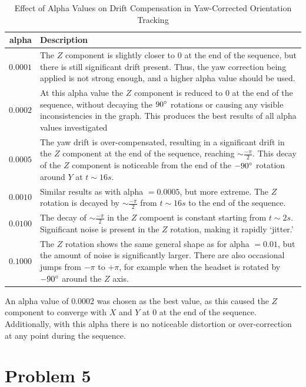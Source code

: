\documentclass[11pt,a4paper]{article}
\begin{document}
	\begin{table}[h!]
		\caption{Effect of Alpha Values on Drift Compensation in Yaw-Corrected Orientation Tracking}
		\label{table_alpha_yaw}
		\begin{tabu} to 1.0\linewidth {|r|X[l]|}
			\hline
			alpha&Description\\
			\hline
			$0.0001$&The $Z$ component is slightly closer to $0$ at the end of the sequence, but there is still significant drift present. Thus, the yaw correction being applied is not strong enough, and a higher alpha value should be used.\\
			\hline
			$0.0002$&At this alpha value the $Z$ component is reduced to 0 at the end of the sequence, without decaying the $90\degree$ rotations or causing any visible inconsistencies in the graph. This produces the best results of all alpha values investigated\\
			\hline
			$0.0005$&The yaw drift is over-compensated, resulting in a significant drift in the $Z$ component at the end of the sequence, reaching $\sim\frac{-\pi}{2}$. This decay of the $Z$ component is noticeable from the end of the $-90\degree$ rotation around $Y$ at $t\sim16s$.\\
			\hline
			$0.0010$&Similar results as with alpha $=0.0005$, but more extreme. The $Z$ rotation is decayed by $\sim\frac{-\pi}{2}$ from $t\sim16s$ to the end of the sequence.\\
			\hline
			$0.0100$&The decay of $\sim\frac{-\pi}{2}$ in the $Z$ compoent is constant starting from $t\sim2s$. Significant noise is present in the $Z$ rotation, making it rapidly `jitter.'\\
			\hline
			$0.1000$&The $Z$ rotation shows the same general shape as for alpha $=0.01$, but the amount of noise is significantly larger. There are also occasional jumps from $-\pi$ to $+\pi$, for example when the headset is rotated by $-90\degree$ around the $Z$ axis.\\
			\hline
		\end{tabu}
	\end{table}
	
	\noindent An alpha value of $0.0002$ was chosen as the best value, as this caused the $Z$ component to converge with $X$ and $Y$ at $0$ at the end of the sequence. Additionally, with this alpha there is no noticeable distortion or over-correction at any point during the sequence.
	
	\section*{Problem 5}
	
\end{document}

